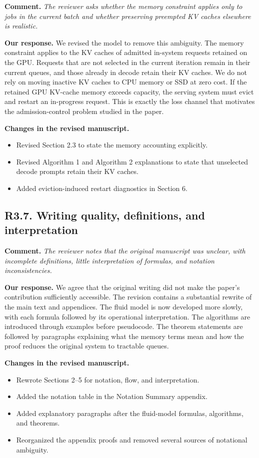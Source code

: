 \documentclass[11pt]{article}
\newcommand{\comment}[1]{%
  \vspace{0.25em}
  \noindent\textbf{Comment.} \emph{#1}
}
\newcommand{\response}{\vspace{0.25em}\noindent\textbf{Our response.} }
\newcommand{\changes}{\vspace{0.25em}\noindent\textbf{Changes in the revised manuscript.} }
\begin{document}
\comment{The reviewer asks whether the memory constraint applies only to jobs in the current batch and whether preserving preempted KV caches elsewhere is realistic.}

\response We revised the model to remove this ambiguity. The memory constraint applies to the KV caches of admitted in-system requests retained on the GPU. Requests that are not selected in the current iteration remain in their current queues, and those already in decode retain their KV caches. We do not rely on moving inactive KV caches to CPU memory or SSD at zero cost. If the retained GPU KV-cache memory exceeds capacity, the serving system must evict and restart an in-progress request. This is exactly the loss channel that motivates the admission-control problem studied in the paper.

\changes
\begin{itemize}
    \item Revised Section 2.3 to state the memory accounting explicitly.
    \item Revised Algorithm 1 and Algorithm 2 explanations to state that unselected decode prompts retain their KV caches.
    \item Added eviction-induced restart diagnostics in Section 6.
\end{itemize}

\subsection*{R3.7. Writing quality, definitions, and interpretation}

\comment{The reviewer notes that the original manuscript was unclear, with incomplete definitions, little interpretation of formulas, and notation inconsistencies.}

\response We agree that the original writing did not make the paper's contribution sufficiently accessible. The revision contains a substantial rewrite of the main text and appendices. The fluid model is now developed more slowly, with each formula followed by its operational interpretation. The algorithms are introduced through examples before pseudocode. The theorem statements are followed by paragraphs explaining what the memory terms mean and how the proof reduces the original system to tractable queues.

\changes
\begin{itemize}
    \item Rewrote Sections 2--5 for notation, flow, and interpretation.
    \item Added the notation table in the Notation Summary appendix.
    \item Added explanatory paragraphs after the fluid-model formulas, algorithms, and theorems.
    \item Reorganized the appendix proofs and removed several sources of notational ambiguity.
\end{itemize}
\end{document}
